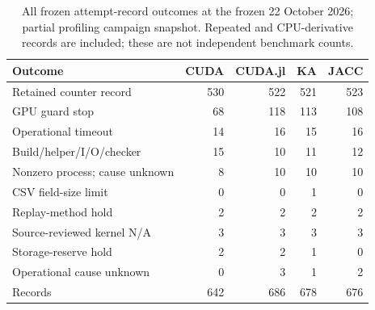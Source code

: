 \begin{table}[t]
\centering\small
\caption{All frozen attempt-record outcomes at the frozen 22 October 2026; partial profiling campaign snapshot. Repeated and CPU-derivative records are included; these are not independent benchmark counts.}
\label{tab:roofline-failures-all-frozen-attempts}
\begin{tabular}{lrrrr}
\toprule
Outcome & CUDA & CUDA.jl & KA & JACC \\
\midrule
Retained counter record & 530 & 522 & 521 & 523 \\
GPU guard stop & 68 & 118 & 113 & 108 \\
Operational timeout & 14 & 16 & 15 & 16 \\
Build/helper/I/O/checker & 15 & 10 & 11 & 12 \\
Nonzero process; cause unknown & 8 & 10 & 10 & 10 \\
CSV field-size limit & 0 & 0 & 1 & 0 \\
Replay-method hold & 2 & 2 & 2 & 2 \\
Source-reviewed kernel N/A & 3 & 3 & 3 & 3 \\
Storage-reserve hold & 2 & 2 & 1 & 0 \\
Operational cause unknown & 0 & 3 & 1 & 2 \\
\midrule
Records & 642 & 686 & 678 & 676 \\
\bottomrule
\end{tabular}
\end{table}
